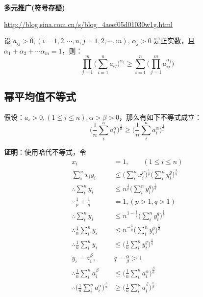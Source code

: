 \documentclass[12pt]{article}
\begin{document}
\begin{mdframed}[
linecolor=black!40,outerlinewidth=1pt,roundcorner=.5em,innertopmargin=1ex,innerbottommargin=.5\baselineskip,innerrightmargin=1em,innerleftmargin=1em,backgroundcolor=gray!5,
]
\textbf{多元推广(符号存疑)}

\url{http://blog.sina.com.cn/s/blog_4aeef05d01030w1g.html}

设 $a_{ij} > 0, (i = 1, 2, \cdots, n, j = 1, 2, \cdots, m)$, $\alpha_j > 0$ 是正实数，且 $\alpha_1 + \alpha_2 + \cdots \alpha_m = 1$，则：
$$
\prod_{j=1}^m\Big(\sum_{i=1}^na_{ij}\Big)^{\alpha_j} \ge \sum_{i=1}^n\Big(\prod_{j=1}^ma_{ij}^{\alpha_j}\Big)
$$
\end{mdframed}

\subsection{幂平均值不等式}
\begin{mdframed}[
linecolor=black!40,outerlinewidth=1pt,roundcorner=.5em,innertopmargin=1ex,innerbottommargin=.5\baselineskip,innerrightmargin=1em,innerleftmargin=1em,backgroundcolor=gray!5,
]
假设：$a_i > 0, (1 \le i \le n), \alpha > \beta > 0$，那么有如下不等式成立：
$$
\Big(\frac{1}{n}\sum_{i}^{n}a_i^{\alpha}\Big)^{\frac{1}{\alpha}} \ge \Big(\frac{1}{n}\sum_{i}^{n}a_i^{\alpha}\Big)^{\frac{1}{\beta}} 
$$
\end{mdframed}
\textbf{证明}：使用哈代不等式，令
\begin{align*}
x_i &= 1, \qquad(1 \le i \le n) \\
\sum_i^nx_iy_i &\le \Big(\sum_i^nx_i^p\Big)^{\frac{1}{p}}\Big(\sum_i^ny_i^q\Big)^{\frac{1}{q}} \\
\therefore \sum_i^ny_i &\le n^{\frac{1}{p}}\Big(\sum_i^ny_i^q\Big)^{\frac{1}{q}} \\
\because \frac{1}{p} + \frac{1}{q} &= 1 , (p > 1, q > 1)\\
\therefore \sum_i^ny_i &\le n^{1-\frac{1}{q}}\Big(\sum_i^ny_i^q\Big)^{\frac{1}{q}} \\
\therefore \frac{1}{n}\sum_i^ny_i &\le n^{-\frac{1}{q}}\Big(\sum_i^ny_i^q\Big)^{\frac{1}{q}} \\
\therefore \frac{1}{n}\sum_i^ny_i &\le \Big(\frac{1}{n}\sum_i^ny_i^q\Big)^{\frac{1}{q}} \\
y_i = a_i^{\beta}, & q = \frac{\alpha}{\beta} > 1 \\
\therefore \frac{1}{n}\sum_i^na_i^{\beta} &\le \Big(\frac{1}{n}\sum_i^na_i^{\alpha}\Big)^{\frac{\beta}{\alpha}} \\
\therefore \Big(\frac{1}{n}\sum_i^na_i^{\alpha}\Big)^{\frac{1}{\alpha}} &\ge \Big(\frac{1}{n}\sum_i^na_i^{\beta}\Big)^{\frac{1}{\beta}} \\
\end{align*}
\end{document}
